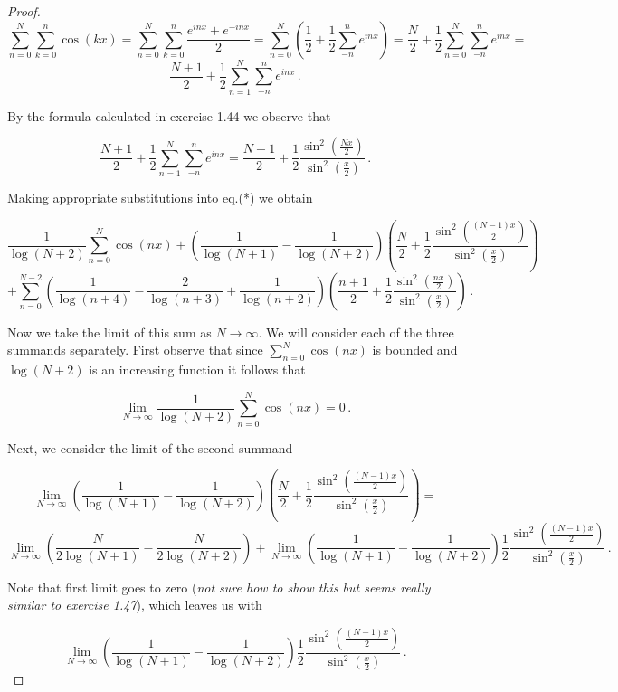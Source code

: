 \documentclass[a4paper]{article}
\numberwithin{equation}{section}
\begin{document}
\begin{description}
\begin{proof}
$$\sum \limits_{n=0}^{N}\sum \limits_{k=0}^{n}\cos(kx) = \sum \limits_{n=0}^{N}\sum \limits_{k=0}^{n}\frac{e^{inx} + e^{-inx}}{2} = \sum \limits_{n=0}^{N}\left(\frac{1}{2}+\frac{1}{2}\sum \limits_{-n}^{n}e^{inx}\right) = \frac{N}{2} + \frac{1}{2}\sum \limits_{n=0}^{N}\sum \limits_{-n}^{n}e^{inx} =$$
$$\frac{N+1}{2} + \frac{1}{2}\sum \limits_{n=1}^{N}\sum \limits_{-n}^{n}e^{inx}\,.$$

By the formula calculated in exercise 1.44 we observe that

$$\frac{N+1}{2} + \frac{1}{2}\sum \limits_{n=1}^{N}\sum \limits_{-n}^{n}e^{inx} = \frac{N+1}{2} + \frac{1}{2}\frac{\sin^2(\frac{Nx}{2})}{\sin^2(\frac{x}{2})}\,.$$

Making appropriate substitutions into eq.(*) we obtain

$$\frac{1}{\log(N+2)}\sum \limits_{n=0}^N\cos(nx)+\left( \frac{1}{\log(N+1)} -\frac{1}{\log(N+2)} \right)\left(\frac{N}{2} + \frac{1}{2}\frac{\sin^2(\frac{(N-1)x}{2})}{\sin^2(\frac{x}{2})}\right)$$
$$+ \sum \limits_{n=0}^{N-2}\left( \frac{1}{\log(n+4)} -\frac{2}{\log(n+3)} +\frac{1}{\log(n+2)} \right)\left(\frac{n+1}{2} + \frac{1}{2}\frac{\sin^2(\frac{nx}{2})}{\sin^2(\frac{x}{2})}\right)\,.$$

Now we take the limit of this sum as $N \rightarrow \infty$. We will consider each of the three summands separately. First observe that since $\sum_{n=0}^N\cos(nx)$ is bounded and $\log(N+2)$ is an increasing function it follows that

$$\lim\limits_{N \rightarrow \infty}\frac{1}{\log(N+2)}\sum \limits_{n=0}^N\cos(nx) = 0\,.$$

Next, we consider the limit of the second summand

$$\lim\limits_{N \rightarrow \infty}\left( \frac{1}{\log(N+1)} -\frac{1}{\log(N+2)} \right)\left(\frac{N}{2} + \frac{1}{2}\frac{\sin^2(\frac{(N-1)x}{2})}{\sin^2(\frac{x}{2})}\right) = $$
$$\lim\limits_{N \rightarrow \infty}\left( \frac{N}{2\log(N+1)} -\frac{N}{2\log(N+2)} \right)+\lim\limits_{N \rightarrow \infty}\left( \frac{1}{\log(N+1)} -\frac{1}{\log(N+2)} \right) \frac{1}{2}\frac{\sin^2(\frac{(N-1)x}{2})}{\sin^2(\frac{x}{2})}\,.$$

Note that first limit goes to zero (\textit{not sure how to show this but seems really similar to exercise 1.47}), which leaves us with

$$\lim\limits_{N \rightarrow \infty}\left( \frac{1}{\log(N+1)} -\frac{1}{\log(N+2)} \right) \frac{1}{2}\frac{\sin^2(\frac{(N-1)x}{2})}{\sin^2(\frac{x}{2})}\,.$$


\end{proof}
\end{description}
\end{document}
